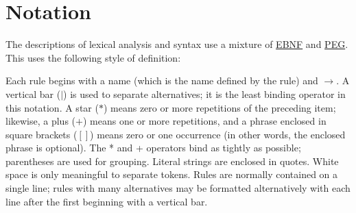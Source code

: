 \section{Notation}
The descriptions of lexical analysis and syntax use a mixture of \href{https://en.wikipedia.org/wiki/Extended_Backus%E2%80%93Naur_form}{EBNF} and \href{https://en.wikipedia.org/wiki/Parsing_expression_grammar}{PEG}. This uses the following style of definition:
\begin{grammar}
\end{grammar}
Each rule begins with a name (which is the name defined by the rule) and $\to$. A vertical bar ($|$) is used to separate alternatives; it is the least binding operator in this notation. A star ($*$) means zero or more repetitions of the preceding item; likewise, a plus ($+$) means one or more repetitions, and a phrase enclosed in square brackets ($[ ]$) means zero or one occurrence (in other words, the enclosed phrase is optional). The * and + operators bind as tightly as possible; parentheses are used for grouping. Literal strings are enclosed in quotes. White space is only meaningful to separate tokens. Rules are normally contained on a single line; rules with many alternatives may be formatted alternatively with each line after the first beginning with a vertical bar.



